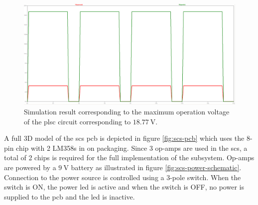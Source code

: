 \documentclass[class=report,11pt,crop=false]{standalone}
\begin{document}
	\begin{figure}[h!]
		\centering
		\includegraphics[width=0.7\linewidth]{Figures/Methodology/sig-cond-plsc-sim-output-1877V}
		\caption{Simulation result corresponding to the maximum operation voltage of the \acrshort{plsc} circuit corresponding to $\SI{18.77}{\volt}$.}
		\label{fig:sig-cond-plsc-sim-output-1877V}
	\end{figure}

	A full 3D model of the \acrshort{scs} \acrshort{pcb} is depicted in figure \ref{fig:scs-pcb} which uses the 8-pin chip with 2 LM358s in on packaging. Since 3 op-amps are used in the \acrshort{scs}, a total of 2 chips is required for the full implementation of the subsystem. Op-amps are powered by a $\SI{9}{\volt}$ battery as illustrated in figure \ref{fig:scs-power-schematic}. Connection to the power source is controlled using a 3-pole switch. When the switch is ON, the power \acrshort{led} is active and when the switch is OFF, no power is supplied to the \acrshort{pcb} and the \acrshort{led} is inactive. 
\end{document}

